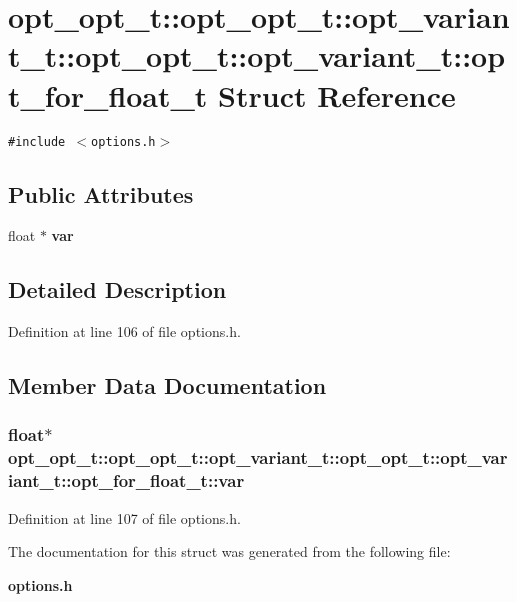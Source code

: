 \section{opt\_\-opt\_\-t::opt\_\-opt\_\-t::opt\_\-variant\_\-t::opt\_\-opt\_\-t::opt\_\-variant\_\-t::opt\_\-for\_\-float\_\-t Struct Reference}
\label{structopt__opt__t_1_1opt__variant__t_1_1opt__for__float__t}
{\tt \#include $<$options.h$>$}

\subsection*{Public Attributes}
\begin{CompactItemize}
\item 
float $\ast$ {\bf var}
\end{CompactItemize}


\subsection{Detailed Description}


Definition at line 106 of file options.h.

\subsection{Member Data Documentation}
\subsubsection[{var}]{\setlength{\rightskip}{0pt plus 5cm}float$\ast$ opt\_\-opt\_\-t::opt\_\-opt\_\-t::opt\_\-variant\_\-t::opt\_\-opt\_\-t::opt\_\-variant\_\-t::opt\_\-for\_\-float\_\-t::var}\label{structopt__opt__t_1_1opt__variant__t_1_1opt__for__float__t_c190148832892a9f72fe0d0f6b222e0f}




Definition at line 107 of file options.h.

The documentation for this struct was generated from the following file:\begin{CompactItemize}
\item 
{\bf options.h}\end{CompactItemize}
